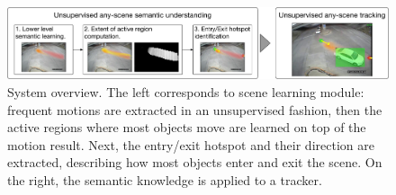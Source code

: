 \begin{figure}
\centering
    \includegraphics[width=\linewidth]{./img/scene_learning/workflow.pdf}
    \caption{System overview. The left corresponds to scene learning module: frequent motions are extracted in an unsupervised fashion, then the active regions where most objects move are learned on top of the motion result. Next, the entry/exit hotspot and their direction are extracted, describing how most objects enter and exit the scene. On the right, the semantic knowledge is applied to a tracker.}
    \label{fig:scene-workflow}
\end{figure}